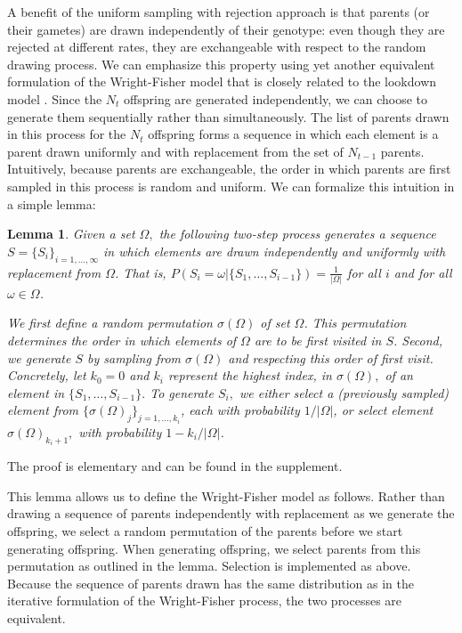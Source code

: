 \documentclass[9pt,twocolumn,twoside,lineno]{gsajnl}
\newtheorem{lemma}[theorem]{Lemma}
\begin{document}
A benefit of the uniform sampling with rejection approach is that parents (or their gametes) are drawn independently of their genotype: even though they are rejected at different rates, they are exchangeable with respect to the random drawing process. We can emphasize this property using yet another equivalent formulation of the Wright-Fisher model that is closely related to the lookdown model \cite{DonnellyKurtz1999a}. Since the $N_t$ offspring are generated independently, we can choose to generate them sequentially rather than simultaneously. The list of parents drawn in this process for the $N_t$ offspring forms a sequence in which each element is a parent drawn uniformly and with replacement from the set of $N_{t-1}$ parents. Intuitively, because parents are exchangeable, the order in which parents are first sampled in this process is random and uniform. We can formalize this intuition in a simple lemma:

\begin{lemma}
 Given a set $\Omega,$ the following two-step process generates a sequence $S=\{S_i\}_{i=1,\ldots,\infty}$ in which elements are drawn independently and uniformly with replacement from $\Omega$. That is, $P(S_i = \omega | \{S_1,\ldots, S_{i-1}\} ) = \frac{1}{|\Omega|}$ for all $i $ and for all $ \omega \in \Omega$. 

We first define a random permutation $\sigma(\Omega)$ of set $\Omega$. This permutation determines the order in which elements of $\Omega$ are to be first visited in $S$.  Second, we generate $S$ by sampling from $\sigma(\Omega)$ and respecting this order of first visit. Concretely, let $k_0=0$ and $k_i$ represent the highest index, in $\sigma(\Omega),$ of an element in $\{S_1,\ldots,S_{i-1}\}.$  To generate $S_i,$ we either select a (previously sampled) element from $\{\sigma(\Omega)_j\}_{j=1,\ldots, k_i}$, each with probability $1/|\Omega|$, or select element $\sigma(\Omega)_{k_i+1},$ with probability $1-k_i/|\Omega|$. 
\end{lemma}
The proof is elementary and can be found in the supplement. 

This lemma allows us to define the Wright-Fisher model as follows. Rather than drawing a sequence of parents independently with replacement as we generate the offspring, we select a random permutation of the parents before we start generating offspring. When generating offspring, we select parents from this permutation as outlined in the lemma. Selection is implemented as above. Because the sequence of parents drawn has the same distribution as in the iterative formulation of the Wright-Fisher process, the two processes are equivalent. 
\end{document}
